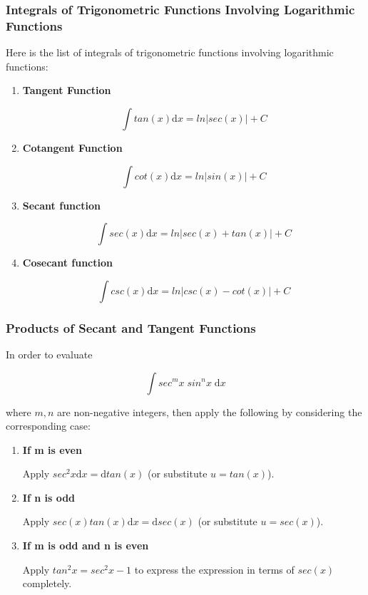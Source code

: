 \documentclass[a4paper,12pt]{article}
\newcommand{\s}{\vspace{1mm}}
\newcommand{\n}{\vspace{3mm}}
\newcommand{\diff}{\mathrm{d}}
\newenvironment{alist}{ %
\begin{enumerate}[label=(\alph*)]
}{
\end{enumerate}
}
\begin{document}
\subsubsection{Integrals of Trigonometric Functions Involving Logarithmic Functions}
Here is the list of integrals of trigonometric functions involving logarithmic functions:

\begin{alist}
  \item \textbf{Tangent Function}\n

  $$\int tan(x)\diff x=ln\left| sec(x)\right| +C$$

  \item \textbf{Cotangent Function}\n

  $$\int cot(x)\diff x=ln\left| sin(x)\right| +C$$

  \item \textbf{Secant function}\n

  $$\int sec(x)\diff x=ln\left| sec(x)+tan(x)\right| +C$$

  \item \textbf{Cosecant function}\n

  $$\int csc(x)\diff x=ln\left| csc(x)-cot(x)\right| +C$$
\end{alist}

\subsubsection{Products of Secant and Tangent Functions}
In order to evaluate

$$\int sec^{m}x\; sin^{n}x\;\diff x$$\s

where $m,n$ are non-negative integers, then apply the following by considering the corresponding case:

\begin{alist}
  \item \textbf{If m is even}\n

  Apply $sec^{2}x\diff x=\diff tan(x)$ (or substitute $u=tan(x)$).

  \item \textbf{If n is odd}\n

  Apply $sec(x)tan(x)\diff x=\diff sec(x)$ (or substitute $u=sec(x)$).

  \item \textbf{If m is odd and n is even}\n

  Apply $tan^{2}x=sec^{2}x-1$ to express the expression in terms of $sec(x)$ completely.
\end{alist}
\end{document}
